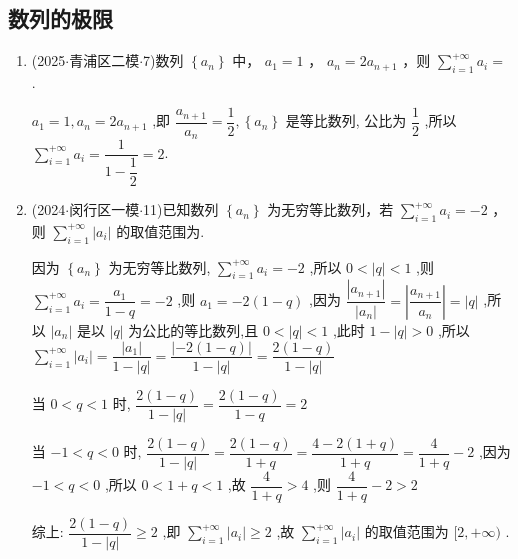 \subsection*{数列的极限}
\begin{enumerate}
    \item (2025$\cdot$青浦区二模$\cdot$7)数列 $\left\{  {a}_{n}\right\}$ 中， ${a}_{1} = 1$ ， ${a}_{n} = 2{a}_{n + 1}$ ，则 $\mathop{\sum }\limits_{{i = 1}}^{{+\infty }}{a}_{i} =$ .
    \begin{jieda}
        ${a}_{1} = 1,{a}_{n} = 2{a}_{n + 1}$ ,即 $\dfrac{{a}_{n + 1}}{{a}_{n}} = \dfrac{1}{2},\left\{  {a}_{n}\right\}$ 是等比数列, 公比为 $\dfrac{1}{2}$ ,所以 $\mathop{\sum }\limits_{{i = 1}}^{{+\infty }}{a}_{i} = \dfrac{1}{1 - \dfrac{1}{2}} = 2$.
    \end{jieda}
    \item (2024$\cdot$闵行区一模$\cdot$11)已知数列 $\left\{  {a}_{n}\right\}$ 为无穷等比数列，若 $\mathop{\sum }\limits_{{i = 1}}^{{+\infty }}{a}_{i} =  - 2$ ，则 $\mathop{\sum }\limits_{{i = 1}}^{{+\infty }}\left| {a}_{i}\right|$ 的取值范围为\blkda[2]{$[2, + \infty)$}.
    \begin{jieda}
        因为 $\left\{  {a}_{n}\right\}$ 为无穷等比数列, $\mathop{\sum }\limits_{{i = 1}}^{{+\infty }}{a}_{i} =  - 2$ ,所以 $0 <  \left| q\right|  < 1$ ,则 $\mathop{\sum }\limits_{{i = 1}}^{{+\infty }}{a}_{i} = \dfrac{{a}_{1}}{1 - q} =  - 2$ ,则 ${a}_{1} =  - 2\left( {1 - q}\right)$ ,因为 $\dfrac{\left| {a}_{n + 1}\right| }{\left| {a}_{n}\right| } = \left| \dfrac{{a}_{n + 1}}{{a}_{n}}\right|  = \left| q\right|$ ,所以 $\left| {a}_{n}\right|$ 是以 $\left| q\right|$ 为公比的等比数列,且 $0 < \left| q\right|  < 1$ ,此时 $1 - |q| > 0$ ,所以 $\mathop{\sum }\limits_{{i = 1}}^{{+\infty }}\left| {a}_{i}\right|  = \dfrac{\left| {a}_{1}\right| }{1 - \left| q\right| } =  \dfrac{\left| -2\left( 1 - q\right) \right| }{1 - \left| q\right| } = \dfrac{2\left( {1 - q}\right) }{1 - \left| q\right| }$
        
        当 $0 < q < 1$ 时, $\dfrac{2\left( {1 - q}\right) }{1 - \left| q\right| } = \dfrac{2\left( {1 - q}\right) }{1 - q}  = 2$
        
        当 $- 1 < q < 0$ 时, $\dfrac{2\left( {1 - q}\right) }{1 - \left| q\right| } = \dfrac{2\left( {1 - q}\right) }{1 + q} = \dfrac{4 - 2\left( {1 + q}\right) }{1 + q} =  \dfrac{4}{1 + q} - 2$ ,因为 $- 1 < q < 0$ ,所以 $0 < 1 + q < 1$ ,故 $\dfrac{4}{1 + q} > 4$ ,则 $\dfrac{4}{1 + q} - 2 > 2$
        
        综上: $\dfrac{2\left( {1 - q}\right) }{1 - \left| q\right| } \geq  2$ ,即 $\mathop{\sum }\limits_{{i = 1}}^{{+\infty }}\left| {a}_{i}\right|  \geq  2$ ,故 $\mathop{\sum }\limits_{{i = 1}}^{{+\infty }}\left| {a}_{i}\right|$ 的取值范围为 $\lbrack 2, + \infty )$ .
    \end{jieda}
\end{enumerate}
